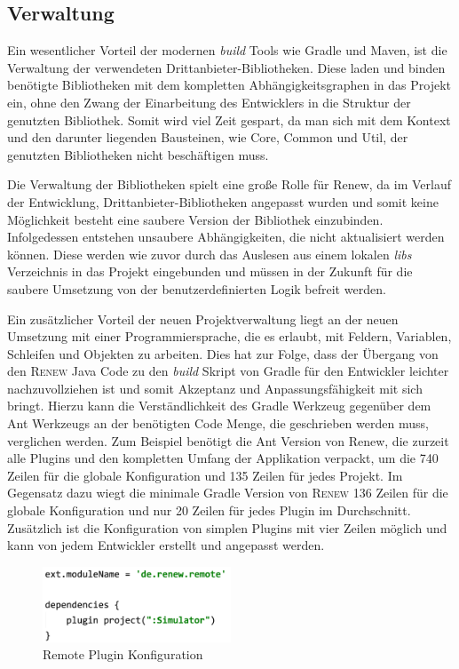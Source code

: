 \subsection{Verwaltung} \label{sub:verwaltung}
	Ein wesentlicher Vorteil der modernen \textit{build} Tools wie Gradle und Maven, ist die Verwaltung der verwendeten Drittanbieter-Bibliotheken. Diese laden und binden benötigte Bibliotheken mit dem kompletten Abhängigkeitsgraphen in das Projekt ein, ohne den Zwang der Einarbeitung des Entwicklers in die Struktur der genutzten Bibliothek. Somit wird viel Zeit gespart, da man sich mit dem Kontext und den darunter liegenden Bausteinen, wie Core, Common und Util, der genutzten Bibliotheken nicht beschäftigen muss. \newline

	Die Verwaltung der Bibliotheken spielt eine große Rolle für Renew, da im Verlauf der Entwicklung, Drittanbieter-Bibliotheken angepasst wurden und somit keine Möglichkeit besteht eine saubere Version der Bibliothek einzubinden. Infolgedessen entstehen  unsaubere Abhängigkeiten, die nicht aktualisiert werden können. Diese werden wie zuvor durch das Auslesen aus einem lokalen \textit{libs} Verzeichnis in das Projekt eingebunden und müssen in der Zukunft für die saubere Umsetzung von der benutzerdefinierten Logik befreit werden.\bigbreak

	Ein zusätzlicher Vorteil der neuen Projektverwaltung liegt an der neuen Umsetzung mit einer Programmiersprache, die es erlaubt, mit Feldern, Variablen, Schleifen und Objekten zu arbeiten. Dies hat zur Folge, dass der Übergang von den \textsc{Renew} Java Code zu den \textit{build} Skript von Gradle für den Entwickler leichter nachzuvollziehen ist und somit Akzeptanz und Anpassungsfähigkeit mit sich bringt. \newline
	Hierzu kann die Verständlichkeit des Gradle Werkzeug gegenüber dem Ant Werkzeugs an der benötigten Code Menge, die geschrieben werden muss, verglichen werden. Zum Beispiel benötigt die Ant Version von Renew, die zurzeit alle Plugins und den kompletten Umfang der Applikation verpackt, um die 740 Zeilen für die globale Konfiguration und 135 Zeilen für jedes Projekt. Im Gegensatz dazu wiegt die minimale Gradle Version von \textsc{Renew} 136 Zeilen für die globale Konfiguration und nur 20 Zeilen für jedes Plugin im Durchschnitt. Zusätzlich ist die Konfiguration von simplen Plugins mit vier Zeilen möglich und kann von jedem Entwickler erstellt und angepasst werden.

	\begin{figure}[h!]
	  \centering
	  \includegraphics[width=0.5\textwidth]{material/images/Remote_config.png}
	  \caption{Remote Plugin Konfiguration}
	  \label{fig:remote_config}
	\end{figure}	

